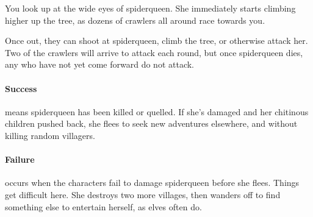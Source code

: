 \begin{boxtext}
  You look up at the wide eyes of \gls{spiderqueen}.
  She immediately starts climbing higher up the tree, as dozens of \glspl{crawler} all around race towards you.
\end{boxtext}

Once out, they can shoot at \gls{spiderqueen}, climb the tree, or otherwise attack her.
Two of the \glspl{crawler} will arrive to attack each round, but once \gls{spiderqueen} dies, any who have not yet come forward do not attack.

\keras

\showStdSpells




\spiderqueen

\showStdSpells[
  
  
  \setcounter{enc}{3}
]

\paragraph{Success} means \gls{spiderqueen} has been killed or quelled.
If she's damaged and her chitinous children pushed back, she flees to seek new adventures elsewhere, and without killing random villagers.

\paragraph{Failure} occurs when the characters fail to damage \gls{spiderqueen} before she flees.
Things get difficult here.
She destroys two more \glspl{village}, then wanders off to find something else to entertain herself, as elves often do.

